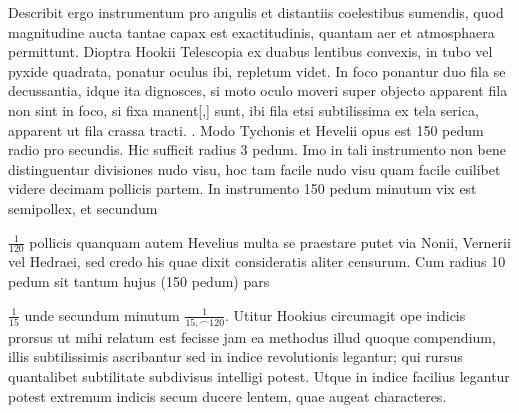 \pend 
\pstart Describit ergo instrumentum pro angulis et distantiis coelestibus sumendis, quod magnitudine aucta tantae capax est exactitudinis, quantam aer et atmosphaera permittunt. 
\pend 
\newpage
\pstart Dioptra\protect{} Hookii Telescopia\protect{} ex duabus lentibus convexis\protect{}, in tubo vel pyxide quadrata, ponatur oculus ibi,  repletum videt. In foco ponantur duo fila se decussantia, idque ita dignosces, si moto oculo moveri super objecto apparent fila non sint in foco, si fixa manent[,] sunt, ibi fila etsi subtilissima ex tela serica, apparent ut fila crassa tracti. 
\pend 
\pstart {}. Modo Tychonis\protect{} et Hevelii\protect{} opus est 150 pedum radio pro secundis. Hic sufficit radius 3 pedum. Imo in tali instrumento non bene distinguentur divisiones nudo visu, hoc tam facile nudo visu quam facile cuilibet videre decimam pollicis partem. In instrumento 150 pedum minutum vix est semipollex, et secundum \rule[-4mm]{0mm}{10mm}$\displaystyle\frac{1}{120}$ pollicis quanquam autem Hevelius multa se praestare putet via Nonii\protect{}, Vernerii\protect{} vel Hedraei\protect{}, sed credo his quae dixit consideratis aliter censurum. Cum radius 10 pedum sit tantum hujus (150 pedum) pars \rule[-4mm]{0mm}{10mm}$\displaystyle\frac{1}{15}$ unde secundum minutum $\displaystyle\frac{1}{15,\smallfrown 120}$. Utitur Hookius\protect{}  circumagit ope indicis prorsus ut mihi relatum est fecisse jam  ea methodus illud quoque compendium,  illis subtilissimis ascribantur sed in indice revolutionis legantur; qui rursus quantalibet subtilitate subdivisus intelligi potest. Utque in indice facilius legantur potest extremum indicis secum ducere lentem, quae augeat characteres. 
